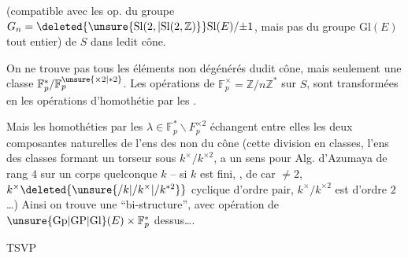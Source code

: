 (compatible avec les op. du groupe
$G_n=\deleted{\unsure{\mathrm{Sl}(2,|\mathrm{Sl}(2,\mathbb Z)}}\mathrm{Sl}(E)/{\pm1}$, mais pas du groupe
$\mathrm{Gl}(E)$ tout entier) de $S$ dans ledit cône.

On ne trouve pas tous les éléments non dégénérés
dudit cône, mais  seulement  une
classe  $\mathbb F_p^*/\mathbb F_p^{\unsure{\times2|*2}}$. Les opérations  de
$\mathbb F_p^\times=\mathbb Z/n\mathbb Z^*$ sur $S$, sont transformées en
les opérations d'homothétie par les .

Mais les homothéties par les $\lambda\in\mathbb F_p^*\smallsetminus F_p^{\times2}$
échangent entre elles les deux
composantes naturelles de l'ens des 
 non  du cône (cette division
en classes,  l'ens des
classes formant un torseur sous $k^\times/k^{\times2}$,
a un sens pour  Alg. d'Azumaya
de rang $4$ sur un corps quelconque $k$ --
si $k$ est fini, , de car $\ne2$, $k^\times\deleted{\unsure{/k|/k^\times|/k^{*2}}}$
cyclique d'ordre pair, $k^\times/k^{\times2}$ est d'ordre $2$
\ldots ) Ainsi on trouve une ``bi-structure'',
avec opération de $\unsure{\mathrm{Gp}|\mathrm{GP}|\mathrm{Gl}}(E)\times\mathbb F_p^*$ dessus\ldots.

\hfill TSVP
